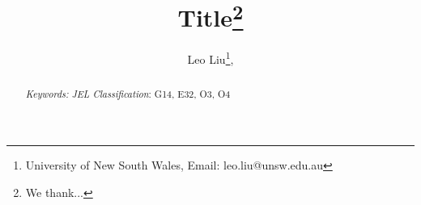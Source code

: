 \documentclass[12pt]{article} %
\begin{document}
	
\author{
	Leo Liu\footnote{University of New South Wales, Email: leo.liu@unsw.edu.au},
}

\title{Title\footnote{We thank...}}

\maketitle
\vspace{-0.5cm}

\onehalfspacing

\begin{abstract}

	\vspace{0.5cm}
	\noindent \emph{Keywords:} 	
  \vspace{0.2cm}
	\noindent \emph{JEL Classification}: G14, E32, O3, O4

\end{abstract}

\thispagestyle{empty}

\clearpage
 
 
 
 
 

\newpage
\FloatBarrier
\singlespace
\begin{multicols}{2}
	
	{\footnotesize
		
	}
\end{multicols}

\clearpage
\FloatBarrier

\begin{appendix}
\renewcommand{\thethm}{A\arabic{thm}}%
\renewcommand{\theprop}{A\arabic{prop}}%
\renewcommand{\thedefn}{A\arabic{defn}}%
\renewcommand{\theequation}{A\arabic{equation}}%
\renewcommand{\thecor}{A\arabic{cor}}%
\renewcommand{\thelemma}{A\arabic{lemma}}
\renewcommand{\thefigure}{A\arabic{figure}}
\renewcommand{\thetable}{A\arabic{table}}

\setcounter{table}{0}
\setcounter{figure}{0}

	 

\renewcommand{\thethm}{B\arabic{thm}}%
\renewcommand{\theprop}{B\arabic{prop}}%
\renewcommand{\thedefn}{B\arabic{defn}}%
\renewcommand{\theequation}{B\arabic{equation}}%
\renewcommand{\thecor}{B\arabic{cor}}%
\renewcommand{\thelemma}{B\arabic{lemma}}
\renewcommand{\thefigure}{B\arabic{figure}}
\renewcommand{\thetable}{B\arabic{table}}

\setcounter{table}{0}
\setcounter{figure}{0}

	 
\end{appendix}
\end{document}
